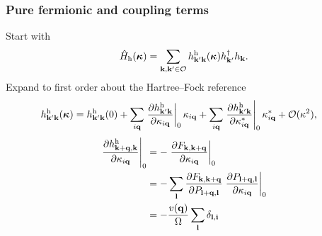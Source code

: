 \begin{frame}
    \frametitle{Pure fermionic and coupling terms}
Start with 
\begin{equation}
    \hat H_{\rm h}(\boldsymbol{\kappa})
    =
    \sum_{\mathbf k,\mathbf k'\in\mathcal O}
    h^{\rm h}_{\mathbf k'\mathbf k}(\boldsymbol{\kappa})
    h_{\mathbf k'}^\dagger h_{\mathbf k}.
    \label{eq:hole_hamiltonian_kappa}
\end{equation} \pause Expand to first order about the
Hartree--Fock reference
\begin{align}
    h^{\rm h}_{\mathbf k'\mathbf k}(\boldsymbol{\kappa})
    &=
    h^{\rm h}_{\mathbf k'\mathbf k}(0)+
    \sum_{i\mathbf q}
    \left.
    \frac{\partial
    h^{\rm h}_{\mathbf k'\mathbf k}}
    {\partial\kappa_{i\mathbf q}}
    \right|_{0}
    \kappa_{i\mathbf q}+
    \sum_{i\mathbf q}
    \left.
    \frac{\partial
    h^{\rm h}_{\mathbf k'\mathbf k}}
    {\partial\kappa_{i\mathbf q}^{*}}
    \right|_{0}
    \kappa_{i\mathbf q}^{*}
    +
    \mathcal O(\kappa^2),
    \label{eq:hole_hamiltonian_expansion}
\end{align} 
\pause
\begin{align}
    \left.
    \frac{\partial
    h^{\rm h}_{\mathbf k+\mathbf q,\mathbf k}}
    {\partial\kappa_{i\mathbf q}}
    \right|_0
    &=
    -
    \left.
    \frac{\partial
    F_{\mathbf k,\mathbf k+\mathbf q}}
    {\partial\kappa_{i\mathbf q}}
    \right|_0
    \\
    &=
    -
    \sum_{\mathbf l}
    \frac{\partial
    F_{\mathbf k,\mathbf k+\mathbf q}}
    {\partial P_{\mathbf l + \mathbf q,\mathbf l}}
    \left.
    \frac{\partial
    P_{\mathbf l + \mathbf q,\mathbf l}}
    {\partial\kappa_{i\mathbf q}}
    \right|_0 \\
&= 
    -
\frac{v(\mathbf q)}{\Omega} \sum_{\mathbf l}
    \delta_{\mathbf l,\mathbf i}
\end{align}
\end{frame}
